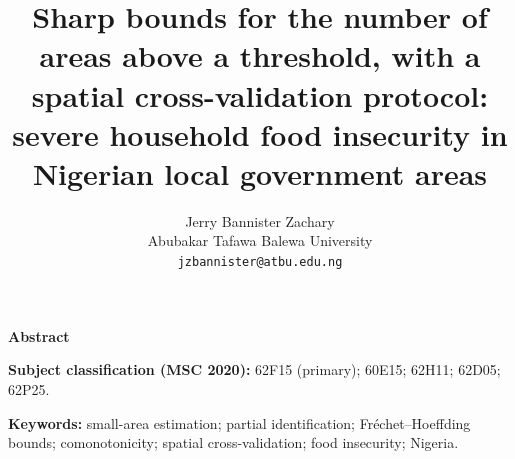 \documentclass[12pt,a4paper]{article}
\title{Sharp bounds for the number of areas above a threshold, with a
spatial cross-validation protocol: severe household food insecurity in
Nigerian local government areas}
\author{%
  Jerry Bannister Zachary\\
  Abubakar Tafawa Balewa University\\
  \texttt{jzbannister@atbu.edu.ng}
}
\date{}
\theoremstyle{definition}
\theoremstyle{remark}
\renewenvironment{abstract}{%
  \par\vspace{0.8em}%
  \begin{center}\textbf{Abstract}\end{center}%
  \normalsize\noindent\ignorespaces
}{%
  \par\vspace{0.8em}%
}
\begin{document}
\maketitle

\begin{abstract}

\end{abstract}

\vspace{0.5em}
\noindent\textbf{Subject classification (MSC 2020):} 62F15 (primary); 60E15; 62H11; 62D05; 62P25.

\vspace{0.3em}
\noindent\textbf{Keywords:} small-area estimation; partial identification; Fr\'echet--Hoeffding bounds;
comonotonicity; spatial cross-validation; food insecurity; Nigeria.


\end{document}
